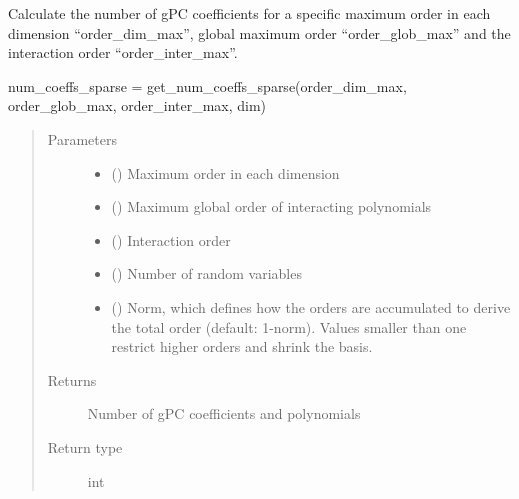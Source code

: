 \documentclass[letterpaper,10pt,english,openany,oneside]{sphinxmanual}
\begin{document}
\begin{fulllineitems}
\label{\detokenize{pygpc:pygpc.misc.get_num_coeffs_sparse}}
Calculate the number of gPC coefficients for a specific maximum order in each dimension “order\_dim\_max”,
global maximum order “order\_glob\_max” and the interaction order “order\_inter\_max”.

num\_coeffs\_sparse = get\_num\_coeffs\_sparse(order\_dim\_max, order\_glob\_max, order\_inter\_max, dim)
\begin{quote}\begin{description}
\item[{Parameters}] \leavevmode\begin{itemize}
\item {} 
 (\sphinxstyleliteralemphasis{\sphinxupquote{ {[}}}\sphinxstyleliteralemphasis{\sphinxupquote{{]}}}) \textendash{} Maximum order in each dimension

\item {} 
 () \textendash{} Maximum global order of interacting polynomials

\item {} 
 () \textendash{} Interaction order

\item {} 
 () \textendash{} Number of random variables

\item {} 
 () \textendash{} Norm, which defines how the orders are accumulated to derive the total order (default: 1-norm).
Values smaller than one restrict higher orders and shrink the basis.

\end{itemize}

\item[{Returns}] \leavevmode
{} \textendash{} Number of gPC coefficients and polynomials

\item[{Return type}] \leavevmode
int

\end{description}\end{quote}

\end{fulllineitems}
\end{document}
